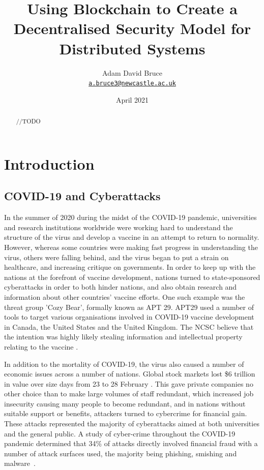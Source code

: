 \documentclass[a4paper, 12pt]{report}
\title{\Huge{\textbf{Using Blockchain to Create a Decentralised Security Model for Distributed Systems}}}
\date{April 2021}
\author{\Large{Adam David Bruce} \\ \texttt{\href{mailto:a.bruce3@newcastle.ac.uk}{a.bruce3@newcastle.ac.uk}}}
\begin{document}
\maketitle

\begin{abstract}
//TODO
\end{abstract}

\tableofcontents
\listoffigures
\listoftables

\newpage

\chapter{Introduction}
\section{COVID-19 and Cyberattacks}
In the summer of 2020 during the midst of the COVID-19 pandemic, universities and research institutions worldwide were working hard to understand the structure of the virus and develop a vaccine in an attempt to return to normality. However, whereas some countries were making fast progress in understanding the virus, others were falling behind, and the virus began to put a strain on healthcare, and increasing critique on governments. In order to keep up with the nations at the forefront of vaccine development, nations turned to state-sponsored cyberattacks in order to both hinder nations, and also obtain research and information about other countries' vaccine efforts. One such example was the threat group 'Cozy Bear', formally known as \acrfull{APT} 29. \acrshort{APT}29 used a number of tools to target various organisations involved in COVID-19 vaccine development in Canada, the United States and the United Kingdom. The \acrfull{NCSC} believe that the intention was highly likely stealing information and intellectual property relating to the vaccine \cite{APT29}.

In addition to the mortality of COVID-19, the virus also caused a number of economic issues across a number of nations. Global stock markets lost \$6 trillion in value over size days from 23 to 28 February \cite{covspill}. This gave private companies no other choice than to make large volumes of staff redundant, which increased job insecurity causing many people to become redundant, and in nations without suitable support or benefits, attackers turned to cybercrime for financial gain. These attacks represented the majority of cyberattacks aimed at both universities and the general public. A study of cyber-crime throughout the COVID-19 pandemic determined that 34\% of attacks directly involved financial fraud with a number of attack surfaces used, the majority being \gls{phishing}, \gls{smishing} and \gls{malware}~\cite{diffattack}.
\end{document}
